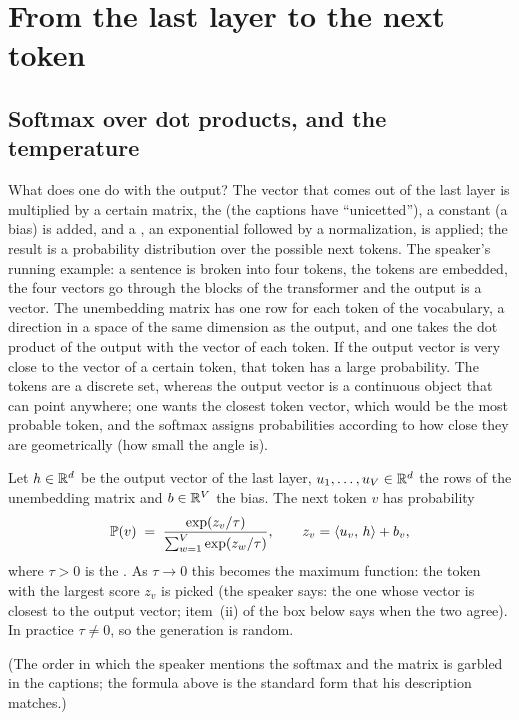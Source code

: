 \section{From the last layer to the next token}\label{sec:L6-output}
\subsection{Softmax over dot products, and the temperature}\label{sec:L6-softmax}
What does one do with the output? The vector that comes out of the last layer is multiplied by a certain matrix, the  (the captions have ``unicetted''), a constant (a bias) is added, and a , an exponential followed by a normalization, is applied; the result is a probability distribution over the possible next tokens. The speaker's running example: a sentence is broken into four tokens, the tokens are embedded, the four vectors go through the blocks of the transformer and the output is a vector. The unembedding matrix has one row for each token of the vocabulary, a direction in a space of the same dimension as the output, and one takes the dot product of the output with the vector of each token. If the output vector is very close to the vector of a certain token, that token has a large probability. The tokens are a discrete set, whereas the output vector is a continuous object that can point anywhere; one wants the closest token vector, which would be the most probable token, and the softmax assigns probabilities according to how close they are geometrically (how small the angle is).

\begin{defn}\label{def:L6-softmax}
Let $h\in\mathbb{R}^d$ be the output vector of the last layer, $u_1,\dots,u_V\in\mathbb{R}^d$ the rows of the unembedding matrix and $b\in\mathbb{R}^V$ the bias. The next token $v$ has probability
\[
  \mathbb{P}(v)\;=\;\frac{\exp(z_v/\tau)}{\sum_{w=1}^{V}\exp(z_w/\tau)},\qquad z_v=\left\langle u_v,\,h\right\rangle+b_v ,
\]
where $\tau>0$ is the . As $\tau\to0$ this becomes the maximum function: the token with the largest score $z_v$ is picked (the speaker says: the one whose vector is closest to the output vector; item~(ii) of the box below says when the two agree). In practice $\tau\neq0$, so the generation is random.
\end{defn}
\noindent (The order in which the speaker mentions the softmax and the matrix is garbled in the captions; the formula above is the standard form that his description matches.)

